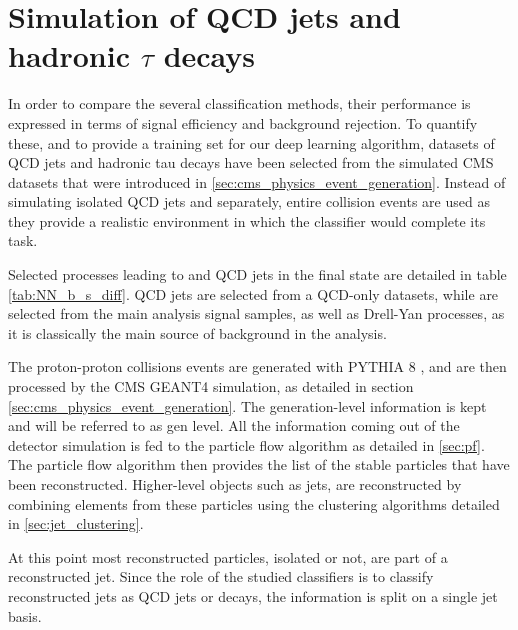 \section{Simulation of QCD jets and hadronic $\tau$ decays}
\label{sec:NN_datasets}

In order to compare the several classification methods, their performance is expressed in terms of signal efficiency and background rejection. To quantify these, and to provide a training set for our deep learning algorithm, datasets of QCD jets and hadronic tau decays have been selected from the simulated CMS datasets that were introduced in \ref{sec:cms_physics_event_generation}. Instead of simulating isolated QCD jets and \tauh separately, entire collision events are used as they provide a realistic environment in which the classifier would complete its task.

Selected processes leading to \tauh and QCD jets in the final state are detailed in table \ref{tab:NN_b_s_diff}. QCD jets are selected from a QCD-only datasets, while \tauh are selected from the main analysis signal samples, as well as Drell-Yan processes, as it is classically the main source of background in the analysis.

The proton-proton collisions events are generated with PYTHIA 8 \cite{SJOSTRAND2008852}, and are then processed by the CMS GEANT4 simulation, as detailed in section \ref{sec:cms_physics_event_generation}. The generation-level information is kept and will be referred to as gen level. All the information coming out of the detector simulation is fed to the particle flow algorithm as detailed in \ref{sec:pf}.
The particle flow algorithm then provides the list of the stable particles that have been reconstructed. Higher-level objects such as jets, are reconstructed by combining elements from these particles using the clustering algorithms detailed in \ref{sec:jet_clustering}.

At this point most reconstructed particles, isolated or not, are part of a reconstructed jet. Since the role of the studied classifiers is to classify reconstructed jets as QCD jets or \tauh decays, the information is split on a single jet basis.

